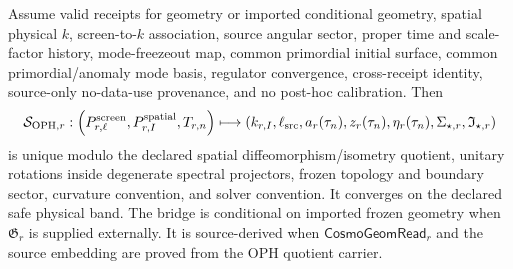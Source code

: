 \begin{theorem}\label{thm:finite-physical-scale-bridge}
Assume valid receipts for geometry or imported conditional geometry, spatial physical \(k\),
screen-to-\(k\) association, source angular sector, proper time and scale-factor history,
mode-freezeout map, common primordial initial surface, common primordial/anomaly mode basis,
regulator convergence, cross-receipt identity, source-only no-data-use provenance, and no post-hoc
calibration.  Then
\[
\mathcal S_{{\rm OPH},r}:
\left(
P^{\rm screen}_{r,\ell},P^{\rm spatial}_{r,I},T_{r,n}
\right)
\longmapsto
\left(
k_{r,I},\ell_{\rm src},a_r(\tau_n),z_r(\tau_n),\eta_r(\tau_n),
\Sigma_{\star,r},\mathfrak I_{\star,r}
\right)
\]
is unique modulo the declared spatial diffeomorphism/isometry quotient, unitary rotations inside
degenerate spectral projectors, frozen topology and boundary sector, curvature convention, and
solver convention.  It converges on the declared safe physical band. The
bridge is conditional on imported frozen geometry when \(\mathfrak G_r\) is
supplied externally. It is source-derived when
\(\mathsf{CosmoGeomRead}_r\) and the source embedding are proved from the OPH
quotient carrier.
\end{theorem}

